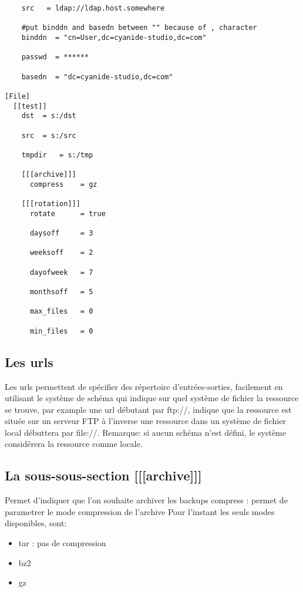 \begin{verbatim}
    src   = ldap://ldap.host.somewhere

    #put binddn and basedn between "" because of , character
    binddn  = "cn=User,dc=cyanide-studio,dc=com"

    passwd  = ******

    basedn  = "dc=cyanide-studio,dc=com"
  
[File]
  [[test]]
    dst  = s:/dst

    src  = s:/src

    tmpdir   = s:/tmp

    [[[archive]]]
      compress    = gz

    [[[rotation]]]
      rotate      = true

      daysoff     = 3

      weeksoff    = 2

      dayofweek   = 7

      monthsoff   = 5

      max_files   = 0

      min_files   = 0	
\end{verbatim}

\subsection*{Les urls}
Les urls permettent de spécifier des répertoire d'entrées-sorties, facilement en utilisant le système de schéma qui indique sur quel système de fichier la ressource se trouve, par example une url débutant par ftp://, indique que la ressource est située sur un serveur FTP à l'inverse une ressource dans un système de fichier local débuttera par file://.
Remarque: si aucun schéma n'est défini, le système considérera la ressource comme locale.


\subsection*{La sous-sous-section [[[archive]]]}
Permet d'indiquer que l'on souhaite archiver les backups
compress : permet de parametrer le mode compression de l'archive
Pour l'instant les seuls modes disponibles, sont:
\begin{itemize}
\item tar : pas de compression
\item bz2
\item gz 
\end{itemize}

\newpage

